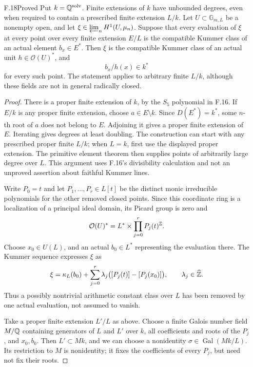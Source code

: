 \begin{claim}{F.18}{Proved}
Put $k=\mathbb Q^{\mathrm{solv}}$. Finite extensions of $k$ have
unbounded degrees, even when required to contain a prescribed finite
extension $L/k$. Let $U\subset\mathbb G_{m,L}$ be a nonempty
open, and let
$\xi\in\varprojlim_n H^1(U,\mu_n)$. Suppose that every evaluation
of $\xi$ at every point over every finite extension $E/L$ is the
compatible Kummer class of an actual element $b_x\in E^*$.
Then $\xi$ is the compatible Kummer class of an actual unit
$h\in\mathcal O(U)^*$, and
\[
 b_x/h(x)\in k^*
\]
for every such point. The statement applies to arbitrary finite
$L/k$, although these fields are not in general radically closed.
\end{claim}
\begin{proof}
There is a proper finite extension of $k$, by the $S_5$ polynomial
in F.16. If $E/k$ is any proper finite extension, choose
$a\in E\setminus k$. Since $D(E^*)=k^*$, some $n$-th root of
$a$ does not belong to $E$. Adjoining it gives a proper finite
extension of $E$. Iterating gives degrees at least doubling.
The construction can start with any prescribed proper finite $L/k$;
when $L=k$, first use the displayed proper extension. The primitive
element theorem then supplies points of arbitrarily large degree
over $L$. This argument uses F.16's divisibility calculation and
not an unproved assertion about faithful Kummer lines.

Write $P_0=t$ and let $P_1,\ldots,P_r\in L[t]$ be the distinct
monic irreducible polynomials for the other removed closed points.
Since this coordinate ring is a localization of a principal ideal
domain, its Picard group is zero and
\[
 \mathcal O(U)^*=L^*\times\prod_{j=0}^rP_j(t)^\mathbb Z.
\]
Choose $x_0\in U(L)$, and an actual $b_0\in L^*$ representing
the evaluation there. The Kummer sequence expresses $\xi$ as
\begin{equation}\label{eq:F18:normalized_class}
 \xi=\kappa_L(b_0)+\sum_{j=0}^r\lambda_j
       \bigl([P_j(t)]-[P_j(x_0)]\bigr),
 \qquad \lambda_j\in\widehat{\mathbb Z}.
\end{equation}
Thus a possibly nontrivial arithmetic constant class over $L$
has been removed by one actual evaluation, not assumed to vanish.

Take a proper finite extension $L'/L$ as above. Choose a finite
Galois number field $M/\mathbb Q$ containing generators of $L$ and $L'$
over $k$, all coefficients and roots of the $P_j$, and $x_0,b_0$.
Then $L'\subset Mk$, and we can choose a nonidentity
$\sigma\in\operatorname{Gal}(Mk/L)$. Its restriction to $M$ is
nonidentity; it fixes the coefficients of every $P_j$, but need
not fix their roots.


\end{proof}

